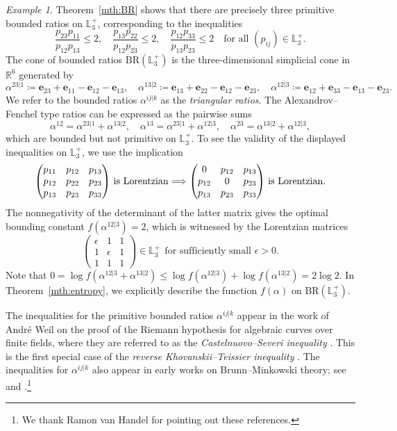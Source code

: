 \documentclass{amsart}
\theoremstyle{definition}
\theoremstyle{remark}
\newtheorem{example}[theorem]{Example}
\def\RR{\mathbb{R}}
\def\L{\mathbb{L}}
\def\BR{\mathrm{BR}}
\begin{document}
\begin{example}
Theorem~\ref{mth:BR} shows that 
there are precisely three primitive bounded ratios on $\L_3^+$, corresponding to the inequalities
\[
\frac{p_{23}p_{11}}{p_{12}p_{13}} \le 2, \quad
\frac{p_{13}p_{22}}{p_{12}p_{23}} \le 2, \quad
\frac{p_{12}p_{33}}{p_{13}p_{23}} \le 2 \quad \text{for all $(p_{ij}) \in \L_3^+$.}
\]
The cone of bounded ratios $\BR(\L_3^+)$ is the three-dimensional simplicial cone in $\RR^6$ generated by
\[
\alpha^{23|1}\coloneq \mathbf{e}_{23}+\mathbf{e}_{11}-\mathbf{e}_{12}-\mathbf{e}_{13}, \quad
\alpha^{13|2}\coloneq\mathbf{e}_{13}+\mathbf{e}_{22}-\mathbf{e}_{12}-\mathbf{e}_{23},  \quad
\alpha^{12|3}\coloneq\mathbf{e}_{12}+\mathbf{e}_{33}-\mathbf{e}_{13}-\mathbf{e}_{23}.
\]
We refer to the bounded ratios $\alpha^{ij|k}$ as the \emph{triangular ratios}. The Alexandrov--Fenchel type ratios can be expressed as the pairwise sums
\[
\alpha^{12}=\alpha^{23|1}+\alpha^{13|2},
 \quad
\alpha^{13}=\alpha^{23|1}+\alpha^{12|3},
\quad
\alpha^{23}=\alpha^{13|2}+\alpha^{12|3},
\]
which are bounded but not primitive on $\L_3^+$.
To see the validity of the displayed inequalities on $\L_3^+$, we use the implication
\[
\text{$
\left(
\begin{matrix}
	p_{11} & p_{12} & p_{13} \\
	p_{12} & p_{22} & p_{23} \\
	p_{13} & p_{23} & p_{33}
\end{matrix}\right)$ is Lorentzian}
\Longrightarrow
\text{$
\left(
\begin{matrix}
	0 & p_{12} & p_{13} \\
	p_{12} & 0 & p_{23} \\
	p_{13} & p_{23} & p_{33}
\end{matrix}\right)$ is Lorentzian.}
\]
The nonnegativity of the determinant of the latter matrix gives the optimal bounding constant $f(\alpha^{12|3})=2$, which is witnessed by the Lorentzian matrices
\[
\left(
\begin{matrix}
	\epsilon & 1 & 1 \\
	1 & \epsilon & 1 \\
	1 & 1 & 1
\end{matrix}\right) \in \L_3^+ \ \ \text{for sufficiently small $\epsilon >0$.}
\]
Note that $0= \log f(\alpha^{12|3}+\alpha^{13|2})\le \log f(\alpha^{12|3})+\log f(\alpha^{13|2})=2 \log 2$.
In Theorem~\ref{mth:entropy}, we explicitly describe the function $f(\alpha)$ on $\BR(\L_3^+)$.


The inequalities for the primitive bounded ratios $\alpha^{ij|k}$
 appear in the work of Andr\'e Weil on the proof of the Riemann hypothesis for algebraic curves over finite fields, where they are referred to as the \emph{Castelnuovo--Severi inequality} \cite[Theorem 1.5]{Milne}.
This is the first special case of the \emph{reverse Khovanskii--Teissier inequality} \cite[Theorem 5.7]{Lehmann-Xiao}. The inequalities for $\alpha^{ij|k}$ also appear
in early works on Brunn--Minkowski theory; see \cite[Page 396]{Frobenius1915} and \cite[Section~51]{Bonnesen-Fenchel}.\footnote{We thank Ramon van Handel for pointing out these references.}
\end{example}
\end{document}
